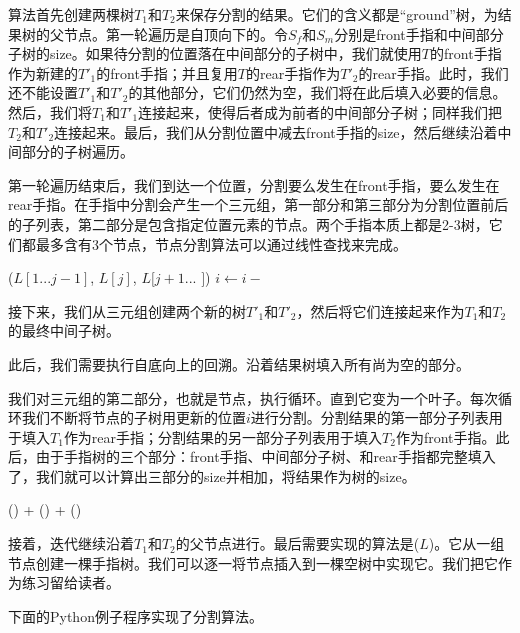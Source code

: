 \documentclass[UTF8]{article}
\begin{document}
算法首先创建两棵树$T_1$和$T_2$来保存分割的结果。它们的含义都是“ground”树，为结果树的父节点。第一轮遍历是自顶向下的。令$S_f$和$S_m$分别是front手指和中间部分子树的size。如果待分割的位置落在中间部分的子树中，我们就使用$T$的front手指作为新建的$T'_1$的front手指；并且复用$T$的rear手指作为$T'_2$的rear手指。此时，我们还不能设置$T'_1$和$T'_2$的其他部分，它们仍然为空，我们将在此后填入必要的信息。然后，我们将$T_1$和$T'_1$连接起来，使得后者成为前者的中间部分子树；同样我们把$T_2$和$T'_2$连接起来。最后，我们从分割位置中减去front手指的size，然后继续沿着中间部分的子树遍历。

第一轮遍历结束后，我们到达一个位置，分割要么发生在front手指，要么发生在rear手指。在手指中分割会产生一个三元组，第一部分和第三部分为分割位置前后的子列表，第二部分是包含指定位置元素的节点。两个手指本质上都是2-3树，它们都最多含有3个节点，节点分割算法可以通过线性查找来完成。

\begin{algorithmic}
      \State \Return ($L[1...j-1]$, $L[j]$, $L[j+1...$  $]$)
    \EndIf
    \State $i \gets i -$ 
  \EndFor
\EndFunction
\end{algorithmic}

接下来，我们从三元组创建两个新的树$T'_1$和$T'_2$，然后将它们连接起来作为$T_1$和$T_2$的最终中间子树。

此后，我们需要执行自底向上的回溯。沿着结果树填入所有尚为空的部分。

我们对三元组的第二部分，也就是节点，执行循环。直到它变为一个叶子。每次循环我们不断将节点的子树用更新的位置$i$进行分割。分割结果的第一部分子列表用于填入$T_1$作为rear手指；分割结果的另一部分子列表用于填入$T_2$作为front手指。此后，由于手指树的三个部分：front手指、中间部分子树、和rear手指都完整填入了，我们就可以计算出三部分的size并相加，将结果作为树的size。

\begin{algorithmic}
  \State \Return {}() + () + ()
\EndFunction
\end{algorithmic}

接着，迭代继续沿着$T_1$和$T_2$的父节点进行。最后需要实现的算法是($L$)。它从一组节点创建一棵手指树。我们可以逐一将节点插入到一棵空树中实现它。我们把它作为练习留给读者。

下面的Python例子程序实现了分割算法。
\end{document}
